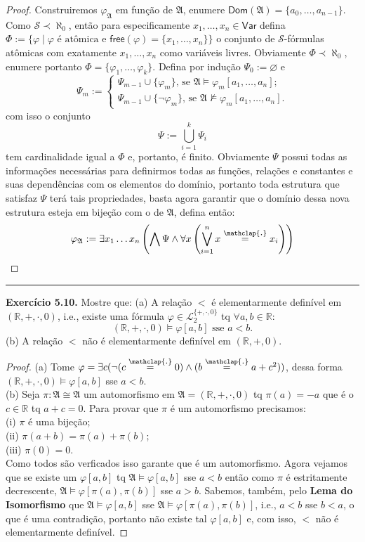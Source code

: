 \documentclass[11pt]{article}
\theoremstyle{definition}
\newcommand{\mc}[1]{\mathcal{#1}}
\newcommand{\mf}[1]{\mathfrak{#1}}
\newcommand{\msf}[1]{\mathsf{#1}}
\newcommand{\mbb}[1]{\mathbb{#1}}
\newcommand\overtext[2]{\stackrel{\mathclap{\normalfont\mbox{#1}}}{#2}}
\begin{document}
\begin{proof}
    Construiremos $\varphi_\mf{A}$ em função de $\mf{A}$, enumere $\msf{Dom}(\mf{A})=\{a_0,\dots,a_{n-1}\}$. Como $\mc{S}\prec\aleph_0$, então para especificamente $x_1,\dots,x_n\in\msf{Var}$ defina $\Phi:=\{\varphi\mid \varphi\text{ é atômica e }\msf{free}(\varphi)=\{x_1,\dots,x_n\}\}$ o conjunto de $\mc{S}$-fórmulas atômicas com exatamente $x_1,\dots,x_n$ como variáveis livres. Obviamente $\Phi\prec\aleph_0$, enumere portanto $\Phi=\{\varphi_1,\dots,\varphi_k\}$. Defina por indução $\Psi_0:=\varnothing$ e\\
    $$\Psi_m:=
    \begin{cases}
        \Psi_{m-1}\cup\{\varphi_m\}\text{, se }\mf{A}\vDash\varphi_m[a_1,\dots,a_n];\\
        \Psi_{m-1}\cup\{\neg\varphi_m\}\text{, se } \mf{A}\nvDash\varphi_m[a_1,\dots,a_n].
    \end{cases}$$
    com isso o conjunto $$\Psi:=\bigcup_{i=1}^{k}\Psi_i$$ tem cardinalidade igual a $\Phi$ e, portanto, é finito. Obviamente $\Psi$ possui todas as informações necessárias para definirmos todas as funções, relações e constantes e suas dependências com os elementos do domínio, portanto toda estrutura que satisfaz $\Psi$ terá tais propriedades, basta agora garantir que o domínio dessa nova estrutura esteja em bijeção com o de $\mf{A}$, defina então:
    $$\varphi_\mf{A}:=\exists x_1\dots x_n\left(\bigwedge\Psi\wedge\forall x\left(\bigvee_{i=1}^n x\overtext{.}{=}x_i\right)\right)$$
\end{proof}

\hrule

\textbf{Exercício 5.10.}
Mostre que: (a) A relação $<$ é elementarmente definível em $(\mbb{R},+,\cdot,0)$, i.e., existe uma fórmula $\varphi\in\mc{L}^{\{+,\cdot,0\}}_2$ tq $\forall a,b\in\mbb{R}$:
\[
(\mbb{R},+,\cdot,0)\vDash\varphi[a,b]\text{ sse }a<b.
\]
(b) A relação $<$ não é elementarmente definível em $(\mbb{R},+,0)$.

\begin{proof}
(a) Tome $\varphi=\exists c(\neg(c\overtext{.}{=}0)\wedge(b\overtext{.}{=}a+c^2))$, dessa forma $(\mbb{R},+,\cdot,0)\vDash\varphi[a,b]$ sse $a<b$.\\
(b) Seja $\pi:\mf{A}\cong\mf{A}$ um automorfismo em $\mf{A}=(\mbb{R},+,\cdot,0)$ tq $\pi(a) = -a$ que é o $c\in\mbb{R}$ tq $a+c=0$. Para provar que $\pi$ é um automorfismo precisamos:\\
(i) $\pi$ é uma bijeção;\\
(ii) $\pi(a+b)=\pi(a)+\pi(b)$;\\
(iii) $\pi(0)=0$.\\
Como todos são verficados isso garante que é um automorfismo. Agora vejamos que se existe um $\varphi[a,b]$ tq $\mf{A}\vDash\varphi[a,b]$ sse $a<b$ então como $\pi$ é estritamente decrescente, $\mf{A}\vDash\varphi[\pi(a),\pi(b)]$ sse $a>b$. Sabemos, também, pelo \textbf{Lema do Isomorfismo} que $\mf{A}\vDash\varphi[a,b]$ sse $\mf{A}\vDash\varphi[\pi(a),\pi(b)]$, i.e., $a<b$ sse $b<a$, o que é uma contradição, portanto não existe tal $\varphi[a,b]$ e, com isso, $<$ não é elementarmente definível.
\end{proof}
\end{document}
